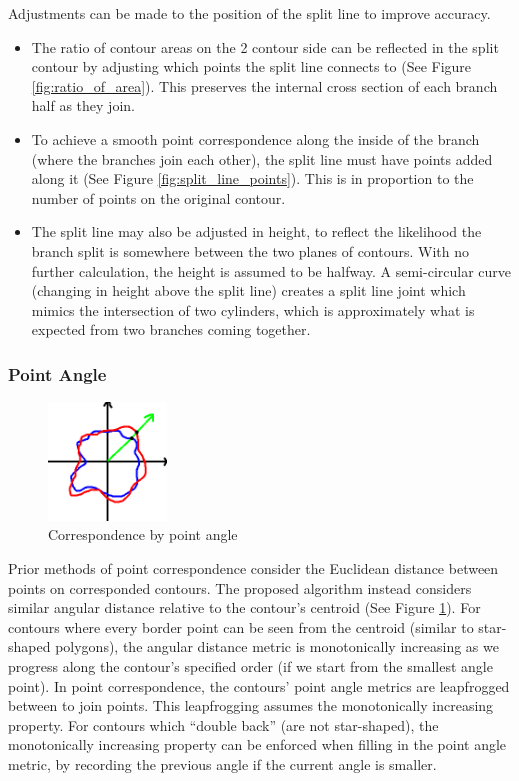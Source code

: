 \documentclass[11p, titlepage]{article}
\begin{document}
Adjustments can be made to the position of the split line to improve accuracy. 
\begin{itemize}
\item The ratio of contour areas on the 2 contour side can be reflected in the split contour by adjusting which points the split line connects to (See Figure \ref{fig:ratio_of_area}). This preserves the internal cross section of each branch half as they join. 
\item To achieve a smooth point correspondence along the inside of the branch (where the branches join each other), the split line must have points added along it (See Figure \ref{fig:split_line_points}). This is in proportion to the number of points on the original contour.
\item The split line may also be adjusted in height, to reflect the likelihood the branch split is somewhere between the two planes of contours. With no further calculation, the height is assumed to be halfway. A semi-circular curve (changing in height above the split line) creates a split line joint which mimics the intersection of two cylinders, which is approximately what is expected from two branches coming together.
\end{itemize}

\subsubsection{Point Angle}

\begin{figure}
\centering
\includegraphics[width=0.28\textwidth]{diagrams/point_angle}
\caption{Correspondence by point angle \label{fig:point_angle}}
\end{figure}

Prior methods of point correspondence consider the Euclidean distance between points on corresponded contours. The proposed algorithm instead considers similar angular distance relative to the contour's centroid (See Figure \ref{fig:point_angle}). For contours where every border point can be seen from the centroid (similar to star-shaped polygons), the angular distance metric is monotonically increasing as we progress along the contour's specified order (if we start from the smallest angle point). In point correspondence, the contours' point angle metrics are leapfrogged between to join points. This leapfrogging assumes the monotonically increasing property. For contours which ``double back'' (are not star-shaped), the monotonically increasing property can be enforced when filling in the point angle metric, by recording the previous angle if the current angle is smaller.
\end{document}
